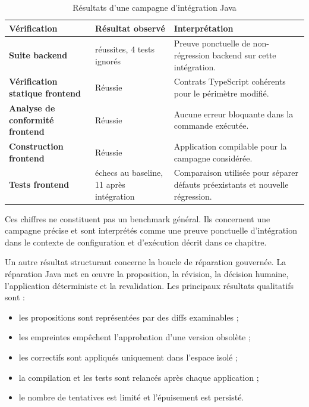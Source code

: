 \begin{table}[H]
    \centering
    \caption{Résultats d'une campagne d'intégration Java}
    \label{tab:resultats-integration-java-ch5}
    \small
    \begin{tabularx}{\textwidth}{|>{\bfseries\RaggedRight\arraybackslash}p{4.2cm}|>{\RaggedRight\arraybackslash}p{3.2cm}|>{\RaggedRight\arraybackslash}X|}
        \hline
        \rowcolor{cgilight!95}
        \textbf{Vérification} & \textbf{Résultat observé} & \textbf{Interprétation} \\
        \hline
        Suite backend & 607 réussites, 4 tests ignorés & Preuve ponctuelle de non-régression backend sur cette intégration. \\
        \hline
        Vérification statique frontend & Réussie & Contrats TypeScript cohérents pour le périmètre modifié. \\
        \hline
        Analyse de conformité frontend & Réussie & Aucune erreur bloquante dans la commande exécutée. \\
        \hline
        Construction frontend & Réussie & Application compilable pour la campagne considérée. \\
        \hline
        Tests frontend & 12 échecs au baseline, 11 après intégration & Comparaison utilisée pour séparer défauts préexistants et nouvelle régression. \\
        \hline
    \end{tabularx}
\end{table}

Ces chiffres ne constituent pas un benchmark général. Ils concernent une campagne précise et sont interprétés comme une preuve ponctuelle d'intégration dans le contexte de configuration et d'exécution décrit dans ce chapitre.

Un autre résultat structurant concerne la boucle de réparation gouvernée. La réparation Java met en œuvre la proposition, la révision, la décision humaine, l'application déterministe et la revalidation. Les principaux résultats qualitatifs sont :

\begin{itemize}
    \item les propositions sont représentées par des diffs examinables ;
    \item les empreintes empêchent l'approbation d'une version obsolète ;
    \item les correctifs sont appliqués uniquement dans l'espace isolé ;
    \item la compilation et les tests sont relancés après chaque application ;
    \item le nombre de tentatives est limité et l'épuisement est persisté.
\end{itemize}

